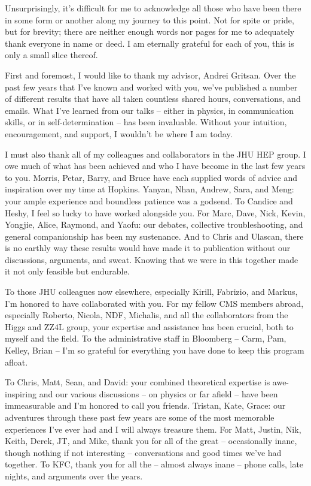 Unsurprisingly, it's difficult for me to acknowledge all those who have been there in some form or another along my journey to this point. Not for spite or pride, but for brevity; there are neither enough words nor pages for me to adequately thank everyone in name or deed. I am eternally grateful for each of you, this is only a small slice thereof. 

First and foremost, I would like to thank my advisor, Andrei Gritsan. Over the past few years that I've known and worked with you, we've published a number of different results that have all taken countless shared hours, conversations, and emails. What I've learned from our talks -- either in physics, in communication skills, or in self-determination -- has been invaluable. Without your intuition, encouragement, and support, I wouldn't be where I am today. 

I must also thank all of my colleagues and collaborators in the JHU HEP group. I owe much of what has been achieved and who I have become in the last few years to you. Morris, Petar, Barry, and Bruce have each supplied words of advice and inspiration over my time at Hopkins. Yanyan, Nhan, Andrew, Sara, and Meng: your ample experience and boundless patience was a godsend. To Candice and Heshy, I feel so lucky to have worked alongside you. For Marc, Dave, Nick, Kevin, Yongjie, Alice, Raymond, and Yaofu: our debates, collective troubleshooting, and general companionship has been my sustenance. And to Chris and Ulascan, there is no earthly way these results would have made it to publication without our discussions, arguments, and sweat. Knowing that we were in this together made it not only feasible but endurable.

To those JHU colleagues now elsewhere, especially Kirill, Fabrizio, and Markus, I'm honored to have collaborated with you. For my fellow CMS members abroad, especially Roberto, Nicola, NDF, Michalis, and all the collaborators from the Higgs and ZZ4L group, your expertise and assistance has been crucial, both to myself and the field. To the administrative staff in Bloomberg -- Carm, Pam, Kelley, Brian -- I'm so grateful for everything you have done to keep this program afloat. 

To Chris, Matt, Sean, and David: your combined theoretical expertise is awe-inspiring and our various discussions -- on physics or far afield -- have been immeasurable and I'm honored to call you friends. Tristan, Kate, Grace: our adventures through these past few years are some of the most memorable experiences I've ever had and I will always treasure them. For Matt, Justin, Nik, Keith, Derek, JT, and Mike, thank you for all of the great -- occasionally inane, though nothing if not interesting -- conversations and good times we've had together. To KFC, thank you for all the  -- almost always inane -- phone calls, late nights, and arguments over the years.

